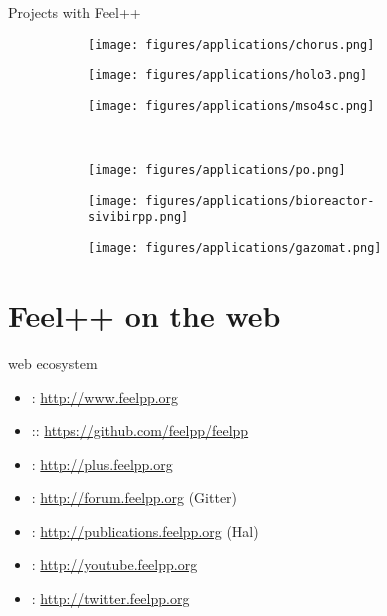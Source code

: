 \begin{frame}{Projects with Feel++}
  \begin{figure}[H]
    \centering
    \begin{subfigure}[b]{.3\linewidth}
      \texttt{[image: figures/applications/chorus.png]}
    \end{subfigure}
    \begin{subfigure}[b]{.3\linewidth}
      \texttt{[image: figures/applications/holo3.png]}
    \end{subfigure}
    \begin{subfigure}[b]{.3\linewidth}
      \texttt{[image: figures/applications/mso4sc.png]}
    \end{subfigure}\\
    \begin{subfigure}[b]{.3\linewidth}
      \texttt{[image: figures/applications/po.png]}
    \end{subfigure}
    \begin{subfigure}[b]{.3\linewidth}
      \texttt{[image: figures/applications/bioreactor-sivibirpp.png]}
    \end{subfigure}
    \begin{subfigure}[b]{.3\linewidth}
      \texttt{[image: figures/applications/gazomat.png]}
    \end{subfigure}

  \end{figure}

\end{frame}


\section{Feel++ on the web}


\begin{frame}{\feel web ecosystem}
  \begin{itemize}
  \item \faChrome: \url{http://www.feelpp.org}
  \item \faGithub :: \url{https://github.com/feelpp/feelpp}
  \item \faGooglePlus: \url{http://plus.feelpp.org}
  \item \faForumbee: \url{http://forum.feelpp.org} (Gitter)
  \item \faNewspaperO: \url{http://publications.feelpp.org} (Hal)
  \item \faYoutube : \url{http://youtube.feelpp.org}
  \item \faTwitter: \url{http://twitter.feelpp.org}
  \end{itemize}
\end{frame}



